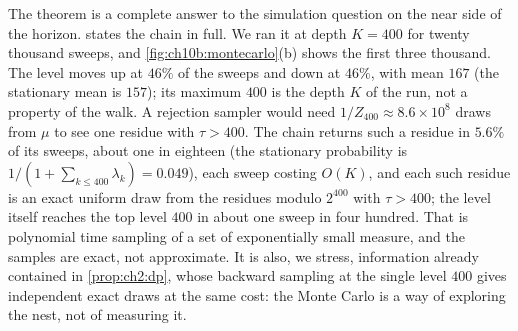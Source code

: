 The theorem is a complete answer to the simulation question on the near side
of the horizon.  states the chain in full. We ran it at depth $K=400$ for twenty thousand sweeps, and \cref{fig:ch10b:montecarlo}(b) shows the first three thousand.
The level moves up at $46\%$ of the sweeps and down at $46\%$, with mean $167$ (the stationary mean is $157$); its maximum $400$ is the depth $K$ of the run, not a property of the walk.
A rejection sampler would need $1/Z_{400}\approx8.6\times10^8$ draws from $\mu$ to see one residue with $\tau>400$. The chain returns such a residue in $5.6\%$ of its sweeps, about one in eighteen (the stationary probability is $1/(1+\sum_{k\le400}\lambda_k)=0.049$), each sweep costing $O(K)$, and each such residue is an exact uniform draw from the residues modulo $2^{400}$ with $\tau>400$; the level itself reaches the top level $400$ in about one sweep in four hundred. That is
polynomial time sampling of a set of exponentially small measure, and the
samples are exact, not approximate. It is also, we stress, information already
contained in \cref{prop:ch2:dp}, whose backward sampling at the single level $400$ gives independent exact draws at the same cost: the Monte Carlo is a way of exploring the
nest, not of measuring it.

